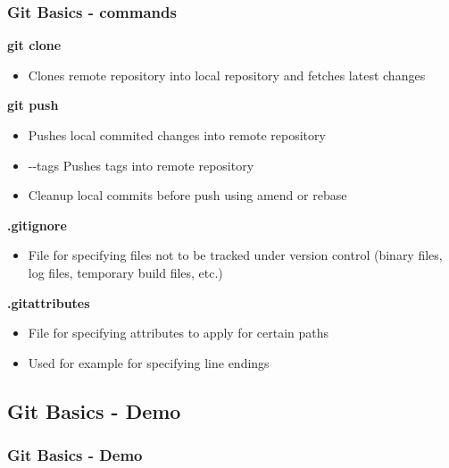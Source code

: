 \begin{frame}
\frametitle{Git Basics - commands}
\textbf{git clone}
	\begin{itemize}
	\item Clones remote repository into local repository and fetches latest changes
	\end{itemize}
\textbf{git push}
	\begin{itemize}
	\item Pushes local commited changes into remote repository
	\item -{}-tags Pushes tags into remote repository
	\item Cleanup local commits before push using amend or rebase
	\end{itemize}
\textbf{.gitignore}
	\begin{itemize}
	\item File for specifying files not to be tracked under version control (binary files, log files, temporary build files, etc.)
	\end{itemize}
\textbf{.gitattributes}
	\begin{itemize}
	\item File for specifying attributes to apply for certain paths
	\item Used for example for specifying line endings
	\end{itemize}
\end{frame}




\subsection[]{Git Basics - Demo}
\begin{frame}
\frametitle{Git Basics - Demo}
\end{frame}






